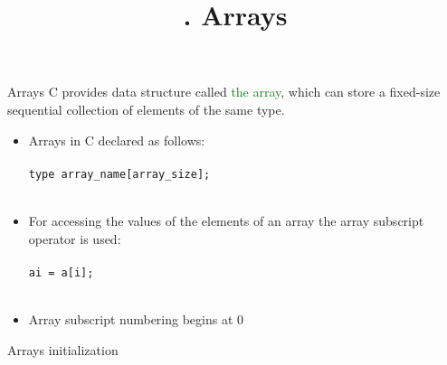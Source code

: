 

\title{. Arrays}




\frame{\titlepage}
\begin{frame}{Arrays}
    \justifying
    C provides data structure called \textcolor{green}{the array}, which can 
    store a fixed-size sequential collection of elements of the same type.
    \begin{itemize}
        \item Arrays in C declared as follows:
            \\~\\
            \texttt{type array\_name[array\_size];}
            \\~\\
        \item For accessing the values of the elements of an array the array subscript operator is used:
            \\~\\
            \texttt{ai = a[i];}
            \\~\\
        \item Array subscript numbering begins at 0
    \end{itemize}
\end{frame}
\begin{frame}{Arrays initialization}
\end{frame}
